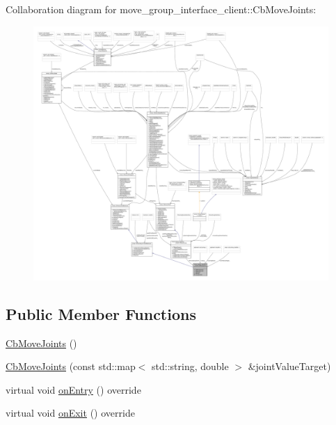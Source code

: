 Collaboration diagram for move\+\_\+group\+\_\+interface\+\_\+client\+:\+:Cb\+Move\+Joints\+:
\nopagebreak
\begin{figure}[H]
\begin{center}
\leavevmode
\includegraphics[width=350pt]{classmove__group__interface__client_1_1CbMoveJoints__coll__graph}
\end{center}
\end{figure}
\subsection*{Public Member Functions}
\begin{DoxyCompactItemize}
\item 
\hyperlink{classmove__group__interface__client_1_1CbMoveJoints_a946c2fd5f9b5415fa9b6a5976fe1b750}{Cb\+Move\+Joints} ()
\item 
\hyperlink{classmove__group__interface__client_1_1CbMoveJoints_a0481527a72230d2399f08cf2f61d9c34}{Cb\+Move\+Joints} (const std\+::map$<$ std\+::string, double $>$ \&joint\+Value\+Target)
\item 
virtual void \hyperlink{classmove__group__interface__client_1_1CbMoveJoints_af1e51367bb28be09704ab3747afff1f1}{on\+Entry} () override
\item 
virtual void \hyperlink{classmove__group__interface__client_1_1CbMoveJoints_ac797c81d4a17c11e224553d9c231fe9f}{on\+Exit} () override
\end{DoxyCompactItemize}

